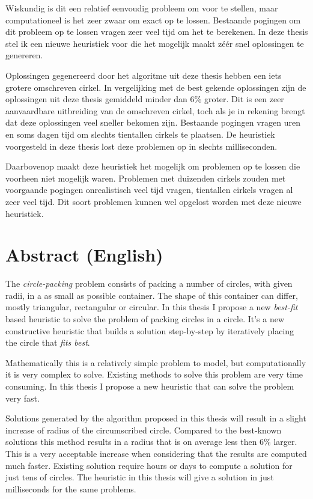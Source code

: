 \documentclass[12pt,a4paper,oneside]{book}
\begin{document}
Wiskundig is dit een relatief eenvoudig probleem om voor te stellen, maar computationeel is het zeer zwaar om exact op te lossen.
Bestaande pogingen om dit probleem op te lossen vragen zeer veel tijd om het te berekenen.
In deze thesis stel ik een nieuwe heuristiek voor die het mogelijk maakt zéér snel oplossingen te genereren.

Oplossingen gegenereerd door het algoritme uit deze thesis hebben een iets grotere omschreven cirkel.
In vergelijking met de best gekende oplossingen zijn de oplossingen uit deze thesis gemiddeld minder dan 6\% groter.
Dit is een zeer aanvaardbare uitbreiding van de omschreven cirkel, toch als je in rekening brengt dat deze oplossingen veel sneller bekomen zijn.
Bestaande pogingen vragen uren en soms dagen tijd om slechts tientallen cirkels te plaatsen.
De heuristiek voorgesteld in deze thesis lost deze problemen op in slechts milliseconden.

Daarbovenop maakt deze heuristiek het mogelijk om problemen op te lossen die voorheen niet mogelijk waren.
Problemen met duizenden cirkels zouden met voorgaande pogingen onrealistisch veel tijd vragen, tientallen cirkels vragen al zeer veel tijd.
Dit soort problemen kunnen wel opgelost worden met deze nieuwe heuristiek.

\newpage

\chapter*{Abstract (English)}

The \textit{circle-packing} problem consists of packing a number of circles, with given radii, in a as small as possible container.
The shape of this container can differ, mostly triangular, rectangular or circular.
In this thesis I propose a new \textit{best-fit} based heuristic to solve the problem of packing circles in a circle.
It's a new constructive heuristic that builds a solution step-by-step by iteratively placing the circle that \textit{fits best}.

Mathematically this is a relatively simple problem to model, but computationally it is very complex to solve.
Existing methods to solve this problem are very time consuming.
In this thesis I propose a new heuristic that can solve the problem very fast.

Solutions generated by the algorithm proposed in this thesis will result in a slight increase of radius of the circumscribed circle.
Compared to the best-known solutions this method results in a radius that is on average less then 6\% larger.
This is a very acceptable increase when considering that the results are computed much faster.
Existing solution require hours or days to compute a solution for just tens of circles.
The heuristic in this thesis will give a solution in just milliseconds for the same problems.
\end{document}
